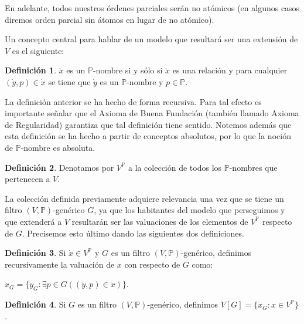 \documentclass[11pt]{unam_tesis1}
\theoremstyle{MyThmStyle}
\theoremstyle{definition}
\newtheorem{definition}{Definici\'on}[chapter]
\theoremstyle{plain}
\theoremstyle{remark}
\begin{document}
En adelante, todos nuestros \'ordenes parciales ser\'an no at\'omicos (en algunos casos diremos orden parcial sin \'atomos en lugar de no at\'omico).

Un concepto central para hablar de un modelo que resultar\'a ser una extensi\'on de $V$ es el siguiente:

\begin{definition}
$\dot x$ es un $\mathbb P$-nombre si y s\'olo si $\dot x$ es una relaci\'on y para cualquier $(\dot y, p) \in \dot x$ se tiene que $\dot y$ es un $\mathbb P$-nombre y $p\in \mathbb P$.
\end{definition}

La definici\'on anterior se ha hecho de forma recursiva. Para tal efecto es importante se\~nalar que el Axioma de Buena Fundaci\'on (tambi\'en llamado Axioma de Regularidad) garantiza que tal definici\'on tiene sentido. Notemos adem\'as que esta definici\'on se ha hecho a partir de conceptos absolutos, por lo que la noci\'on de $\mathbb P$-nombre es absoluta.

\begin{definition}
Denotamos por $V^{\mathbb P}$ a la colecci\'on de todos los $\mathbb P$-nombres que pertenecen a $V$.
\end{definition}

La colecci\'on definida previamente adquiere relevancia una vez que se tiene un filtro $(V,\mathbb P)$-gen\'erico $G$, ya que los habitantes del modelo que perseguimos y que extender\'a a $V$ resultar\'an ser las valuaciones de los elementos de $V^{\mathbb P}$ respecto de $G$. Precisemos esto \'ultimo dando las siguientes dos definiciones.

\begin{definition}
Si $\dot x\in V^{\mathbb P}$ y $G$ es un filtro $(V,\mathbb P)$-gen\'erico, definimos recursivamente la valuaci\'on de $\dot x$ con respecto de $G$ como: 
\begin{center}
$\dot x_G=\{\dot y_G:\exists p\in G((\dot y,p)\in \dot x)\}$.
\end{center}
\end{definition}

\begin{definition}\label{V[G]}
Si $G$ es un filtro $(V,\mathbb P)$-gen\'erico, definimos 
$V[G]=\{\dot x_G:\dot x\in V^{\mathbb P} \}$.
\end{definition}
\end{document}
